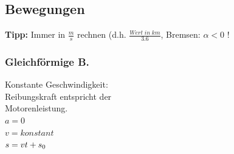 \subsection{Bewegungen}
\textbf{Tipp:} Immer in $\frac{m}{s}$ rechnen (d.h. $\frac{Wert \; in \; km}{3.6}$, 	Bremsen: $\alpha < 0$ !
\begin{multicols}{3}
	\subsubsection{Gleichförmige B.}
	Konstante Geschwindigkeit: \\
	Reibungskraft entspricht der \\
	Motorenleistung. \\
	$a = 0$ \\
	$v = konstant$\\
	$s = vt + s\textsubscript{0}$ \\
	\\
	\\
\columnbreak

\end{multicols}
